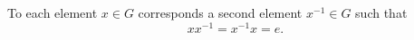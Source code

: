 To each element $x \in G$ corresponds a second element $x^{-1} \in G$ such that
$$xx^{-1} = x^{-1}x = e.$$

